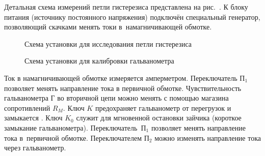 %

\experiment

Детальная схема измерений петли гистерезиса представлена
на рис.~.
К блоку питания (источнику постоянного напряжения)
подключён специальный генератор, позволяющий скачками менять токи
в~намагничивающей обмотке.

%

\begin{figure}[h!]
	\caption{Схема установки для исследования петли гистерезиса}
\end{figure}

\begin{figure}[h!]
    \caption{Схема установки для калибровки гальванометра}
\end{figure}

Ток в  намагничивающей  обмотке  измеряется   амперметром. Переключатель
$\text{П}_1$ позволяет менять направление тока в первичной обмотке.
Чувствительность гальванометра $\text{Г}$ во вторичной цепи можно менять  с
помощью  магазина  сопротивлений $R_M$.  Ключ $K$ предохраняет гальванометр  от
перегрузок и замыкается .  Ключ $K_0$  служит  для  мгновенной остановки зайчика  (короткое
замыкание  гальванометра). Переключатель~П$_1$ позволяет менять направление
тока в~первичной обмотке. Переключателем $\text{П}_2$ можно изменять
направление тока через гальванометр.

